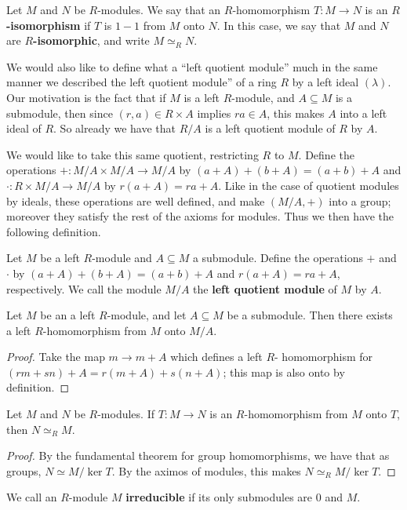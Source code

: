 \begin{definition}
    Let $M$ and  $N$ be  $R$-modules. We say that an  $R$-homomorphism  $T:M \rightarrow N$ is an
    \textbf{$R$-isomorphism} if $T$ is  $1-1$ from  $M$ onto  $N$. In this case, we say that  $M$
    and  $N$ are  \textbf{$R$-isomorphic}, and write $M \simeq_R N$.
\end{definition}

We would also like to define what a ``left quotient module'' much in the same manner we described
the left quotient module'' of a ring $R$ by a left ideal  $(\lambda)$. Our motivation is the fact
that if $M$ is a left $R$-module, and  $A \subseteq M$ is a submodule, then since  $(r,a) \in R
\times A$ implies $ra \in A$, this makes  $A$ into a left ideal of  $R$. So already we have that
$R/A$ is a left quotient module of  $R$ by  $A$.

We would like to take this same quotient, restricting $R$ to  $M$. Define the operations  $+:M/A
\times M/A \rightarrow M/A$ by $(a+A)+(b+A)=(a+b)+A$ and $\cdot:R \times M/A \rightarrow M/A$ by
$r(a+A)=ra+A$. Like in the case of quotient modules by ideals, these operations are well defined,
and make $(M/A,+)$ into a group; moreover they satisfy the rest of the axioms for modules. Thus we
then have the following definition.

\begin{definition}
    Let $M$ be a left $R$-module and  $A \subseteq M$ a submodule. Define the operations  $+$ and
    $\cdot$ by  $(a+A)+(b+A)=(a+b)+A$ and $r(a+A)=ra+A$, respectively. We call the module $M/A$ the
     \textbf{left quotient module} of $M$ by  $A$.
\end{definition}

\begin{lemma}\label{1.5.5.}
    Let $M$ be an a left $R$-module, and let $A \subseteq M$ be a submodule. Then there exists a
    left  $R$-homomorphism from  $M$ onto  $M/A$.
\end{lemma}
\begin{proof}
    Take the map $m \rightarrow m+A$ which defines a left $R$- homomorphism for
    $(rm+sn)+A=r(m+A)+s(n+A)$; this map is also onto by definition.
\end{proof}

\begin{theorem}\label{1.5.6}
    Let $M$ and  $N$ be  $R$-modules. If $T:M \rightarrow N$ is an $R$-homomorphism from  
    $M$ onto  $T$, then $N \simeq_R M$.
\end{theorem}
\begin{proof}
    By the fundamental theorem for group homomorphisms, we have that as groups, $N \simeq
    M/\ker{T}$. By the aximos of modules, this makes $N \simeq_R M/\ker{T}$.
\end{proof}

\begin{definition}
    We call an $R$-module  $M$  \textbf{irreducible} if its only submodules are $0$ and  $M$.
\end{definition}
